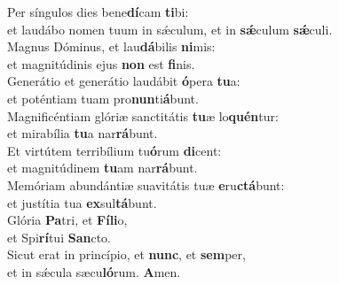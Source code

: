 \evenverse Per síngulos dies bene\textbf{dí}cam \textbf{ti}bi:~\*\\
\evenverse et laudábo nomen tuum in sǽculum, et in \textbf{sǽ}culum \textbf{sǽ}culi.\\
\oddverse Magnus Dóminus, et lau\textbf{dá}bilis \textbf{ni}mis:~\*\\
\oddverse et magnitúdinis ejus \textbf{non} est \textbf{fi}nis.\\
\evenverse Generátio et generátio laudábit \textbf{ó}pera \textbf{tu}a:~\*\\
\evenverse et poténtiam tuam pro\textbf{nun}ti\textbf{á}bunt.\\
\oddverse Magnificéntiam glóriæ sanctitátis \textbf{tu}æ lo\textbf{quén}tur:~\*\\
\oddverse et mirabília \textbf{tu}a nar\textbf{rá}bunt.\\
\evenverse Et virtútem terribílium tu\textbf{ó}rum \textbf{di}cent:~\*\\
\evenverse et magnitúdinem \textbf{tu}am nar\textbf{rá}bunt.\\
\oddverse Memóriam abundántiæ suavitátis tuæ \textbf{e}ru\textbf{ctá}bunt:~\*\\
\oddverse et justítia tua \textbf{ex}sul\textbf{tá}bunt.\\
\evenverse Glória \textbf{Pa}tri, et \textbf{Fí}\textbf{li}o,~\*\\
\evenverse et Spi\textbf{rí}tui \textbf{San}cto.\\
\oddverse Sicut erat in princípio, et \textbf{nunc}, et \textbf{sem}per,~\*\\
\oddverse et in sǽcula sæcu\textbf{ló}rum. \textbf{A}men.\\
